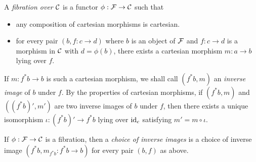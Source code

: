 \documentclass{amsart}
\begin{document}
\begin{definition}
    A \emph{fibration over $\mathcal C$} is a functor $\phi:\mathcal F\to \mathcal C$ such that 
    \begin{itemize}
    \item any composition of cartesian morphisms is cartesian.
    \item for every
        pair $(b,f:c\to d)$ where $b$ is an object of $\mathcal F$ and $f:c\to d$ is a morphism
        in $\mathcal C$ with $d=\phi(b)$,
        there exists a cartesian morphism $m:a\to b$ lying over $f$.
    \end{itemize}

    If $m:f^\ast b\to b$ is such a cartesian morphism, we shall call 
        $(f^\ast b,m)$ an \emph{inverse image} of $b$ under $f$.
    By the properties of cartesian morphisms,
        if $(f^\ast b, m)$ and $((f^\ast b)',m')$ are two inverse images of $b$
        under $f$, then there exists a unique isomorphism $\iota: (f^\ast b)'\to f^\ast b$
        lying over $\operatorname{id}_c$ satisfying $m'=m\circ \iota$.

    If $\phi:\mathcal F\to \mathcal C$ is a fibration, then a \emph{choice of inverse images}
        is a choice of inverse image $(f^\ast b,m_{f^\ast b}:f^\ast b\to b)$
        for every pair $(b,f)$ as above.
\end{definition}
\end{document}
